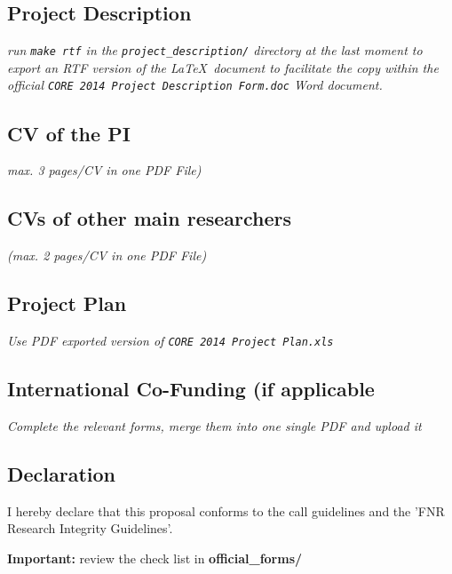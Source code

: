 \documentclass[11pt,twoside,a4paper]{article}
\newcommand{\Attachment}[1]{
  \IfFileExists {#1}{}
}
\begin{document}
\subsection{Project Description}
\emph{run \texttt{make rtf} in the \texttt{project\_description/} directory at
  the last moment to export an RTF version of the \LaTeX\ document to facilitate the copy within
  the official \texttt{CORE\ 2014\ Project\ Description\ Form.doc} Word
  document. }


\subsection{CV of the PI}
\emph{max. 3 pages/CV in one PDF File)}

\Attachment {CVs/cv-PI.pdf}


\subsection{CVs of other main researchers}
\emph{ (max. 2 pages/CV in one PDF File)}


\subsection{Project Plan}
\emph{Use PDF exported version of \texttt{CORE\ 2014\ Project\ Plan.xls}}

\subsection{International Co-Funding (if applicable}
\emph{Complete the relevant forms, merge them into one single PDF and upload it}


\subsection{Declaration}


I hereby declare that this proposal conforms to the call guidelines and the 'FNR
Research Integrity Guidelines'.

\textbf{Important:} review the check list in \textbf{official\_forms/}




\end{document}
